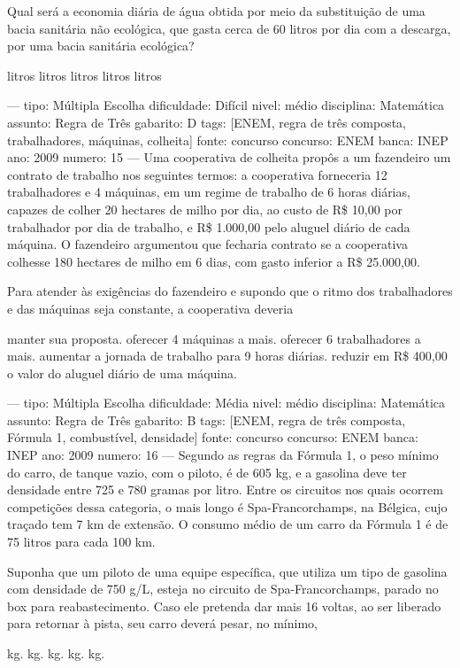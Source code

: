 Qual será a economia diária de água obtida por meio da substituição de uma bacia sanitária não ecológica, que gasta cerca de 60 litros por dia com a descarga, por uma bacia sanitária ecológica?
\begin{choices}
 litros
 litros
 litros
 litros
 litros
\end{choices}

---
tipo: Múltipla Escolha
dificuldade: Difícil
nivel: médio
disciplina: Matemática
assunto: Regra de Três
gabarito: D
tags: [ENEM, regra de três composta, trabalhadores, máquinas, colheita]
fonte: concurso
concurso: ENEM
banca: INEP
ano: 2009
numero: 15
---
\question
Uma cooperativa de colheita propôs a um fazendeiro um contrato de trabalho nos seguintes termos: a cooperativa forneceria 12 trabalhadores e 4 máquinas, em um regime de trabalho de 6 horas diárias, capazes de colher 20 hectares de milho por dia, ao custo de R\$ 10,00 por trabalhador por dia de trabalho, e R\$ 1.000,00 pelo aluguel diário de cada máquina. O fazendeiro argumentou que fecharia contrato se a cooperativa colhesse 180 hectares de milho em 6 dias, com gasto inferior a R\$ 25.000,00.

Para atender às exigências do fazendeiro e supondo que o ritmo dos trabalhadores e das máquinas seja constante, a cooperativa deveria
\begin{choices}
\choice manter sua proposta.
\choice oferecer 4 máquinas a mais.
\choice oferecer 6 trabalhadores a mais.
\CorrectChoice aumentar a jornada de trabalho para 9 horas diárias.
\choice reduzir em R\$ 400,00 o valor do aluguel diário de uma máquina.
\end{choices}

---
tipo: Múltipla Escolha
dificuldade: Média
nivel: médio
disciplina: Matemática
assunto: Regra de Três
gabarito: B
tags: [ENEM, regra de três composta, Fórmula 1, combustível, densidade]
fonte: concurso
concurso: ENEM
banca: INEP
ano: 2009
numero: 16
---
\question
Segundo as regras da Fórmula 1, o peso mínimo do carro, de tanque vazio, com o piloto, é de 605 kg, e a gasolina deve ter densidade entre 725 e 780 gramas por litro. Entre os circuitos nos quais ocorrem competições dessa categoria, o mais longo é Spa-Francorchamps, na Bélgica, cujo traçado tem 7 km de extensão. O consumo médio de um carro da Fórmula 1 é de 75 litros para cada 100 km.

Suponha que um piloto de uma equipe específica, que utiliza um tipo de gasolina com densidade de 750 g/L, esteja no circuito de Spa-Francorchamps, parado no box para reabastecimento. Caso ele pretenda dar mais 16 voltas, ao ser liberado para retornar à pista, seu carro deverá pesar, no mínimo,
\begin{choices}
 kg.
 kg.
 kg.
 kg.
 kg.
\end{choices}
